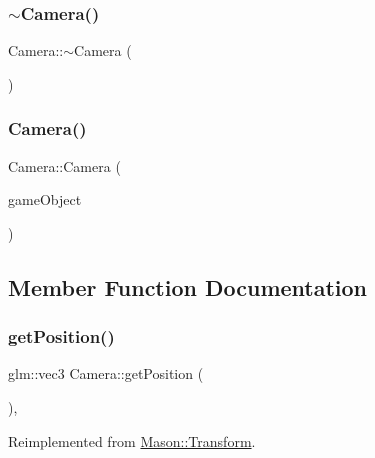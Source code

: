 \subsubsection{\texorpdfstring{$\sim$\+Camera()}{~Camera()}}
{\footnotesize\ttfamily Camera\+::$\sim$\+Camera (\begin{DoxyParamCaption}{ }\end{DoxyParamCaption})}

\hypertarget{class_mason_1_1_camera_aca4e1307d4601e7f0a711dfd94729143}{}\label{class_mason_1_1_camera_aca4e1307d4601e7f0a711dfd94729143} 
\subsubsection{\texorpdfstring{Camera()}{Camera()}}
{\footnotesize\ttfamily Camera\+::\+Camera (\begin{DoxyParamCaption}\item[{\hyperlink{class_mason_1_1_game_object}{Game\+Object} $\ast$}]{game\+Object }\end{DoxyParamCaption})\hspace{0.3cm}{\ttfamily [protected]}}



\subsection{Member Function Documentation}
\hypertarget{class_mason_1_1_camera_a71560b8b6216a542ae1958bd91a4361d}{}\label{class_mason_1_1_camera_a71560b8b6216a542ae1958bd91a4361d} 
\subsubsection{\texorpdfstring{get\+Position()}{getPosition()}}
{\footnotesize\ttfamily glm\+::vec3 Camera\+::get\+Position (\begin{DoxyParamCaption}{ }\end{DoxyParamCaption})\hspace{0.3cm}{\ttfamily [override]}, {\ttfamily [virtual]}}



Reimplemented from \hyperlink{class_mason_1_1_transform_a0b21f641e72d7b55f3a630b986d0b106}{Mason\+::\+Transform}.

